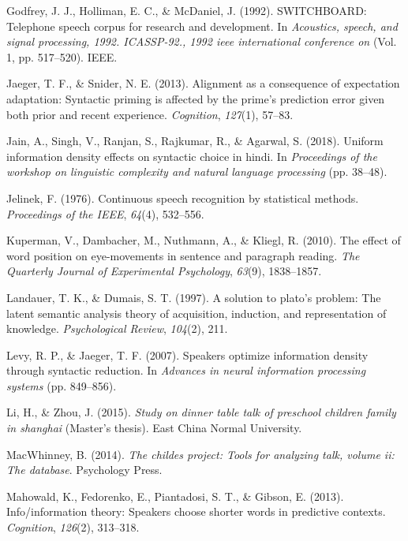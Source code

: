 \documentclass[10pt, letterpaper]{article}
\begin{document}
\leavevmode\hypertarget{ref-godfrey1992}{}%
Godfrey, J. J., Holliman, E. C., \& McDaniel, J. (1992). SWITCHBOARD:
Telephone speech corpus for research and development. In
\emph{Acoustics, speech, and signal processing, 1992. ICASSP-92., 1992
ieee international conference on} (Vol. 1, pp. 517--520). IEEE.

\leavevmode\hypertarget{ref-jaeger2013}{}%
Jaeger, T. F., \& Snider, N. E. (2013). Alignment as a consequence of
expectation adaptation: Syntactic priming is affected by the prime's
prediction error given both prior and recent experience.
\emph{Cognition}, \emph{127}(1), 57--83.

\leavevmode\hypertarget{ref-jain2018}{}%
Jain, A., Singh, V., Ranjan, S., Rajkumar, R., \& Agarwal, S. (2018).
Uniform information density effects on syntactic choice in hindi. In
\emph{Proceedings of the workshop on linguistic complexity and natural
language processing} (pp. 38--48).

\leavevmode\hypertarget{ref-jelinek1976}{}%
Jelinek, F. (1976). Continuous speech recognition by statistical
methods. \emph{Proceedings of the IEEE}, \emph{64}(4), 532--556.

\leavevmode\hypertarget{ref-kuperman2010}{}%
Kuperman, V., Dambacher, M., Nuthmann, A., \& Kliegl, R. (2010). The
effect of word position on eye-movements in sentence and paragraph
reading. \emph{The Quarterly Journal of Experimental Psychology},
\emph{63}(9), 1838--1857.

\leavevmode\hypertarget{ref-landauer1997}{}%
Landauer, T. K., \& Dumais, S. T. (1997). A solution to plato's problem:
The latent semantic analysis theory of acquisition, induction, and
representation of knowledge. \emph{Psychological Review}, \emph{104}(2),
211.

\leavevmode\hypertarget{ref-levy2007}{}%
Levy, R. P., \& Jaeger, T. F. (2007). Speakers optimize information
density through syntactic reduction. In \emph{Advances in neural
information processing systems} (pp. 849--856).

\leavevmode\hypertarget{ref-li2015}{}%
Li, H., \& Zhou, J. (2015). \emph{Study on dinner table talk of
preschool children family in shanghai} (Master's thesis). East China
Normal University.

\leavevmode\hypertarget{ref-macwhinney2014}{}%
MacWhinney, B. (2014). \emph{The childes project: Tools for analyzing
talk, volume ii: The database}. Psychology Press.

\leavevmode\hypertarget{ref-mahowald2013}{}%
Mahowald, K., Fedorenko, E., Piantadosi, S. T., \& Gibson, E. (2013).
Info/information theory: Speakers choose shorter words in predictive
contexts. \emph{Cognition}, \emph{126}(2), 313--318.
\end{document}
